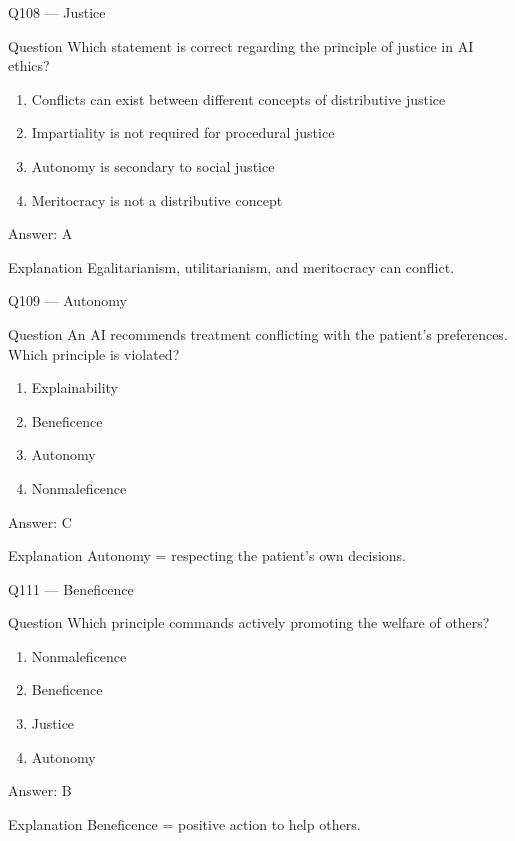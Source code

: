 \documentclass[aspectratio=169,8pt]{beamer}
\begin{document}
	\begin{frame}{Q108 --- Justice}
		\begin{block}{Question}
			Which statement is correct regarding the principle of justice in AI ethics?
		\end{block}
		\begin{enumerate}
			\item Conflicts can exist between different concepts of distributive justice
			\item Impartiality is not required for procedural justice
			\item Autonomy is secondary to social justice
			\item Meritocracy is not a distributive concept
		\end{enumerate}
		\begin{exampleblock}{Answer: A}\end{exampleblock}
		\begin{block}{Explanation}
			Egalitarianism, utilitarianism, and meritocracy can conflict.
		\end{block}
	\end{frame}
	
	\begin{frame}{Q109 --- Autonomy}
		\begin{block}{Question}
			An AI recommends treatment conflicting with the patient's preferences. Which principle is violated?
		\end{block}
		\begin{enumerate}
			\item Explainability
			\item Beneficence
			\item Autonomy
			\item Nonmaleficence
		\end{enumerate}
		\begin{exampleblock}{Answer: C}\end{exampleblock}
		\begin{block}{Explanation}
			Autonomy = respecting the patient's own decisions.
		\end{block}
	\end{frame}
	

	
	\begin{frame}{Q111 --- Beneficence}
		\begin{block}{Question}
			Which principle commands actively promoting the welfare of others?
		\end{block}
		\begin{enumerate}
			\item Nonmaleficence
			\item Beneficence
			\item Justice
			\item Autonomy
		\end{enumerate}
		\begin{exampleblock}{Answer: B}\end{exampleblock}
		\begin{block}{Explanation}
			Beneficence = positive action to help others.
		\end{block}
	\end{frame}
	
\end{document}
